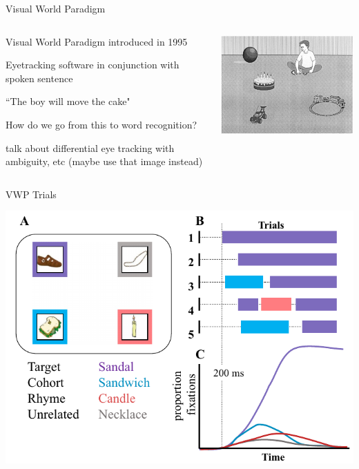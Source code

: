\documentclass{beamer}
\newcommand{\vp}{\vspace{2mm}}
\begin{document}
\begin{frame}{Visual World Paradigm}
\begin{columns}
\begin{column}{0.45\textwidth}

Visual World Paradigm introduced in 1995 \vp

Eyetracking software in conjunction with spoken sentence \vp

``The boy will move the cake" \vp

How do we go from this to word recognition? \vp

talk about differential eye tracking with ambiguity, etc (maybe use that image instead)

\end{column}
\begin{column}{0.5\textwidth}  %
\begin{center}
\includegraphics[scale=.9]{img/vwp_classic.png}
\end{center}
\end{column}
\end{columns}
\end{frame}



\begin{frame}{VWP Trials}
\begin{center}
\includegraphics[scale=0.4]{img/bob_vwp_full.png}
\end{center}
\end{frame}
\end{document}
